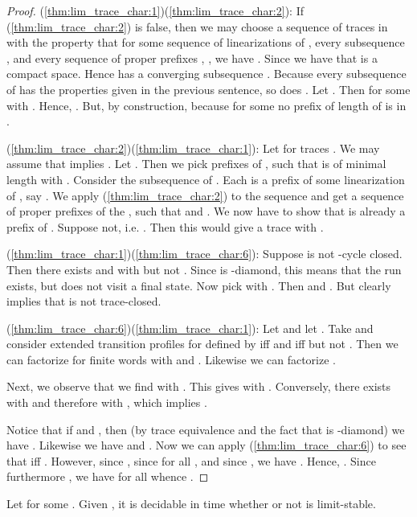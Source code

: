 \begin{proof}
(\ref{thm:lim_trace_char:1})(\ref{thm:lim_trace_char:2}): If (\ref{thm:lim_trace_char:2}) is false, then we may choose a sequence  of traces in  with the property that for some sequence  of linearizations of , every subsequence , and every sequence  of proper prefixes , , we have . Since  we have that  is a compact space. Hence  has a converging subsequence . Because every subsequence of  has the properties given in the previous sentence, so does . Let . Then  for some  with . Hence, . But, by construction,  because for some  no prefix of length  of  is in .

(\ref{thm:lim_trace_char:2})(\ref{thm:lim_trace_char:1}): Let  for traces . We may assume that  implies . Let . Then we pick prefixes  of , such that  is of minimal length with . Consider the subsequence  of . Each  is a prefix of some linearization of , say . We apply (\ref{thm:lim_trace_char:2}) to the sequence  and get a sequence  of proper prefixes of the , such that  and . We now have to show that  is already a prefix of . Suppose not, i.e. . Then this would give a trace  with . 

(\ref{thm:lim_trace_char:1})(\ref{thm:lim_trace_char:6}): Suppose  is not -cycle closed. Then there exists  and  with  but not . Since  is -diamond, this means that the run  exists, but does not visit a final state. Now pick  with . Then  and . But clearly  implies that  is not trace-closed.

(\ref{thm:lim_trace_char:6})(\ref{thm:lim_trace_char:1}): Let  and let . Take  and consider extended transition profiles  for  defined by  iff  and  iff  but not . Then we can factorize  for finite words  with  and . Likewise we can factorize . 

Next, we observe that we find  with . This gives  with . Conversely, there exists  with  and therefore  with , which implies . 

Notice that if  and  , then (by trace equivalence and the fact that  is -diamond) we have . Likewise we have  and . Now we can apply (\ref{thm:lim_trace_char:6}) to see that  iff . However, since , since  for all , and since ,  we have  .  Hence, . Since furthermore , we have for all  whence .
\end{proof}

\begin{corollary}\label{cor:I-DBA-decidable}
Let  for some . Given , it is decidable in time  whether or not  is limit-stable.
\end{corollary}

